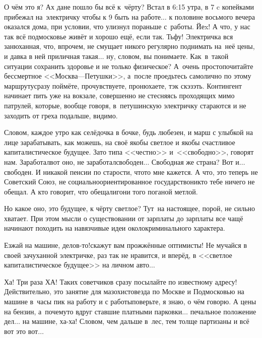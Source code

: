 О чём это я? Ах да\mdash не пошло бы всё к~чёрту? Встал в 6:15 утра, в 7 c копейками прибежал на~электричку чтобы к 9 быть на работе$\ldots$ к половине восьмого вечера оказался дома, при условии, что улизнул пораньше с~работы. Йеx! А что, у нас так всё подмосковье живёт и хорошо ещё, если так. Тьфу! Электричка вся занюханная, что, впрочем, не смущает никого регулярно поднимать на~неё цены, и давка в ней приличная такая$\ldots$ ну, словом, вы понимаете. Как~в~такой ситуации сохранить здоровье и не только физическое? А~очень просто\mdash почитайте бессмертное <<Москва\thinspace\nobreakdash---\thinspace Петушки>>\cite{МоскваПетушки}, а~после проедьтесь самолично по этому маршруту\mdash сразу поймёте, прочувствуете, пронюхаете, тэк скэзэть. Контингент начинает пить уже на вокзале, совершенно не стесняясь проходящих мимо патрулей, которые, вообще говоря, в~петушинскую электричку стараются и не заходить от греха подальше, видимо.

Словом, каждое утро как селёдочка в бочке, будь любезен, и марш с улыбкой на лице зарабатывать, как можешь, на своё якобы светлое и якобы счастливое капиталистическое будущее. Зато типа <<честно>> и~<<свободно>>, говорят нам. Заработал\mdash вот оно, не заработал\mdash свободен$\ldots$ Свободная же страна? Вот и$\ldots$ свободен. И никакой пенсии по старости, что\sdash то мне кажется. А что, это теперь не Советский Союз, не социально\sdash ориентированное государство\mdash никто тебе ничего не обещал. А кто говорит, что обещали\mdash гони того поганой метлой.

Но какое оно, это будущее, к чёрту светлое? Тут~на настоящее, порой, не сильно хватает. 
При этом мысли о существовании от зарплаты до зарплаты все чащё начинают походить на навязчивые идеи околокриминального характера.

\diagdash Езжай на машине, делов-то!\mdash скажут вам прожжённые оптимисты! \mdash Не мучайся в своей зачуханной электричке, раз так не нравится, и вперёд, в <<светлое капиталистическое будущее>> на личном авто$\ldots$ 

Ха! Три раза ХА! Таких советчиков сразу посылайте по известному адресу! Действительно, это занятие для мазохистов\mdash езда по Москве и Подмосковью на машине в~часы пик на работу и с работы\mdash поверьте, я знаю, о чём говорю. А цены на бензин, а~почему\sdash то вдруг ставшие платными парковки$\ldots$ печальное положение дел$\ldots$ на машине, ха-ха! Словом, чем дальше в~лес, тем толще партизаны и всё вот это вот$\ldots$%

